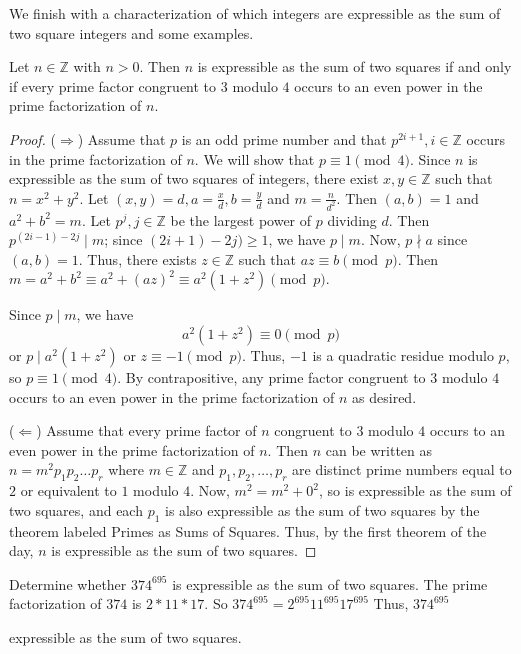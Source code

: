 \documentclass{ximera}
\begin{document}
We finish with a characterization of which integers are expressible as the sum of two square integers and some examples.

\begin{theorem}
Let $n\in\mathbb{Z}$ with $n>0$. Then $n$ is expressible as the sum of two squares if and only if every prime factor congruent to $3$ modulo  $4$ occurs to an even power in the prime factorization of $n$.
\end{theorem}
\begin{proof}
 ($\Rightarrow$) Assume that $p$ is an odd prime number and that $p^{2i+1},i\in\mathbb{Z}$ occurs in the prime factorization of $n$. We will show that $p\equiv 1 \pmod 4$. Since $n$ is expressible as the sum of two squares of integers, there exist $x,y\in\mathbb{Z}$ such that $n=x^2+y^2.$ Let $(x,y)=d, a=\frac{x}{d},b=\frac{y}{d}$ and  $m=\frac{n}{d^2}$. Then $(a,b)=1$ and $a^2+b^2=m$. Let $p^j,j\in\mathbb{Z}$ be the largest power of $p$ dividing $d$. Then $p^{(2i-1)-2j}\mid m$; since $(2i+1)-2j)\geq 1$, we have $p\mid m$. Now, $p\nmid a$ since $(a,b)=1$. Thus, there exists $z\in\mathbb{Z}$ such that $az\equiv b \pmod p$. Then $m=a^2+b^2\equiv a^2+(az)^2\equiv a^2(1+z^2)\pmod p$.
 
 Since $p\mid m$, we have \[a^2(1+z^2)\equiv 0\pmod p\] or $p\mid a^2(1+z^2)$ or $z\equiv -1 \pmod p$. Thus, $-1$ is a quadratic residue modulo $p$, so $p\equiv 1 \pmod 4$. By contrapositive, any prime factor congruent to $3$ modulo $4$ occurs to an even power in the prime factorization of $n$ as desired.
 
 ($\Leftarrow$) Assume that every prime factor of $n$ congruent to $3$ modulo $4$ occurs to an even power in the prime factorization of $n$. Then $n$ can be written as $n=m^2p_1p_2\dots  p_r$ where $m\in\mathbb{Z}$ and $p_1,p_2,\dots,p_r$ are distinct prime numbers equal to $2$ or equivalent to $1$ modulo $4$. Now, $m^2=m^2+0^2$, so is expressible as the sum of two squares, and each $p_1$ is also expressible as the sum of two squares by the theorem labeled Primes as Sums of Squares. Thus, by the first theorem of the day, $n$ is expressible as the sum of two squares.
\end{proof}

\begin{example}
 Determine whether $374^{695}$ is expressible as the sum of two squares. The prime factorization of $374$ is $2*11*17$. So $374^{695}=2^{695}11^{695}17^{695}$ Thus, $374^{695}$
 
\begin{multipleChoice}
\end{multipleChoice}
expressible as the sum of two squares.
\end{example}
\end{document}
